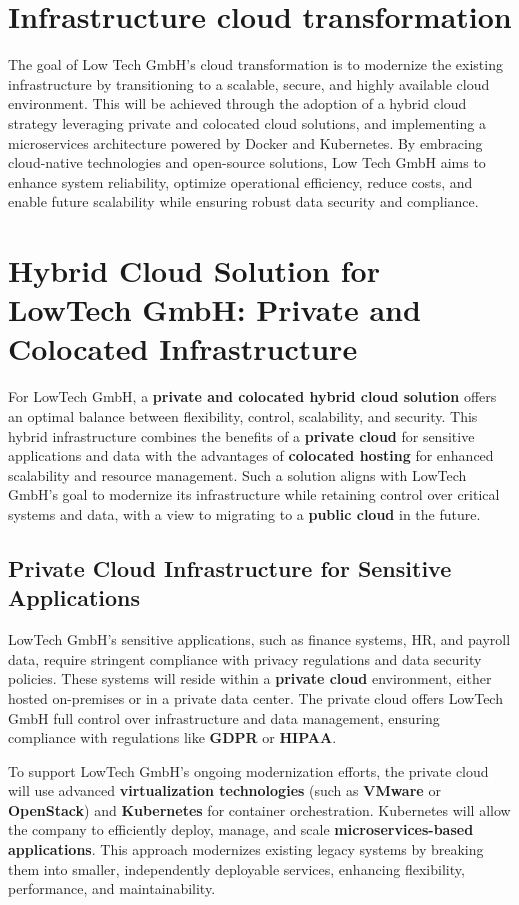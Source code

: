 \section{Infrastructure cloud transformation}
\label{sec:to-be}

The goal of Low Tech GmbH's cloud transformation is to modernize the existing infrastructure by transitioning to a scalable, secure, and highly available cloud environment. This will be achieved through the adoption of a hybrid cloud strategy leveraging private and colocated cloud solutions, and implementing a microservices architecture powered by Docker and Kubernetes. By embracing cloud-native technologies and open-source solutions, Low Tech GmbH aims to enhance system reliability, optimize operational efficiency, reduce costs, and enable future scalability while ensuring robust data security and compliance.

\section{Hybrid Cloud Solution for LowTech GmbH: Private and Colocated Infrastructure}

For LowTech GmbH, a \textbf{private and colocated hybrid cloud solution} offers an optimal balance between flexibility, control, scalability, and security. This hybrid infrastructure combines the benefits of a \textbf{private cloud} for sensitive applications and data with the advantages of \textbf{colocated hosting} for enhanced scalability and resource management. Such a solution aligns with LowTech GmbH’s goal to modernize its infrastructure while retaining control over critical systems and data, with a view to migrating to a \textbf{public cloud} in the future.

\subsection{Private Cloud Infrastructure for Sensitive Applications}

LowTech GmbH’s sensitive applications, such as finance systems, HR, and payroll data, require stringent compliance with privacy regulations and data security policies. These systems will reside within a \textbf{private cloud} environment, either hosted on-premises or in a private data center. The private cloud offers LowTech GmbH full control over infrastructure and data management, ensuring compliance with regulations like \textbf{GDPR} or \textbf{HIPAA}.

To support LowTech GmbH’s ongoing modernization efforts, the private cloud will use advanced \textbf{virtualization technologies} (such as \textbf{VMware} or \textbf{OpenStack}) and \textbf{Kubernetes} for container orchestration. Kubernetes will allow the company to efficiently deploy, manage, and scale \textbf{microservices-based applications}. This approach modernizes existing legacy systems by breaking them into smaller, independently deployable services, enhancing flexibility, performance, and maintainability.


